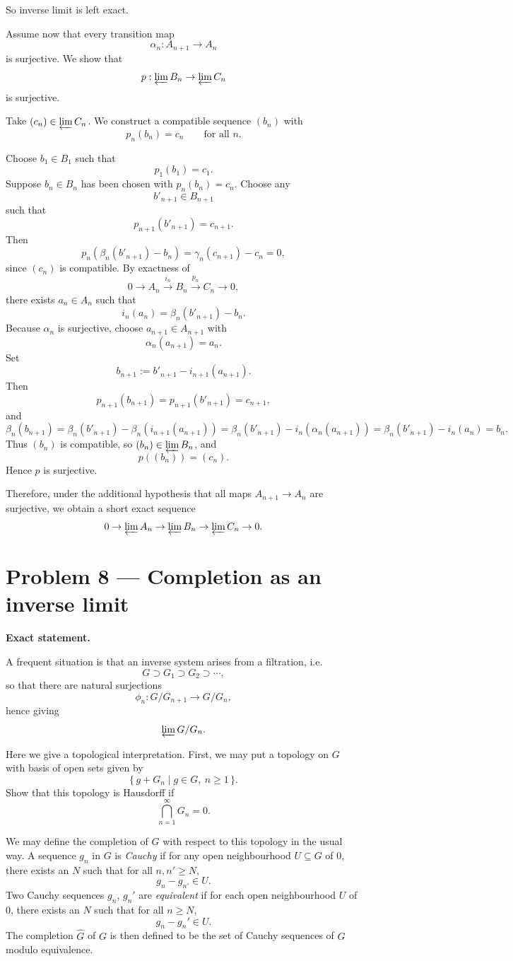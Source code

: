 \documentclass[12pt,a4paper]{article}
\theoremstyle{plain}
\theoremstyle{definition}      %
\begin{document}
So inverse limit is left exact.

\medskip
Assume now that every transition map
\[
\alpha_n:A_{n+1}\to A_n
\]
is surjective. We show that
\[
p:\varprojlim B_n\to \varprojlim C_n
\]
is surjective.

Take \((c_n)\in\varprojlim C_n\). We construct a compatible sequence \((b_n)\) with
\[
p_n(b_n)=c_n
\qquad \text{for all }n.
\]

Choose \(b_1\in B_1\) such that
\[
p_1(b_1)=c_1.
\]
Suppose \(b_n\in B_n\) has been chosen with \(p_n(b_n)=c_n\). Choose any
\[
b'_{n+1}\in B_{n+1}
\]
such that
\[
p_{n+1}(b'_{n+1})=c_{n+1}.
\]
Then
\[
p_n(\beta_n(b'_{n+1})-b_n)
=
\gamma_n(c_{n+1})-c_n
=
0,
\]
since \((c_n)\) is compatible. By exactness of
\[
0\to A_n\xrightarrow{i_n} B_n\xrightarrow{p_n} C_n\to 0,
\]
there exists \(a_n\in A_n\) such that
\[
i_n(a_n)=\beta_n(b'_{n+1})-b_n.
\]
Because \(\alpha_n\) is surjective, choose \(a_{n+1}\in A_{n+1}\) with
\[
\alpha_n(a_{n+1})=a_n.
\]
Set
\[
b_{n+1}:=b'_{n+1}-i_{n+1}(a_{n+1}).
\]
Then
\[
p_{n+1}(b_{n+1})=p_{n+1}(b'_{n+1})=c_{n+1},
\]
and
\[
\beta_n(b_{n+1})
=
\beta_n(b'_{n+1})-\beta_n(i_{n+1}(a_{n+1}))
=
\beta_n(b'_{n+1})-i_n(\alpha_n(a_{n+1}))
=
\beta_n(b'_{n+1})-i_n(a_n)
=
b_n.
\]
Thus \((b_n)\) is compatible, so \((b_n)\in\varprojlim B_n\), and
\[
p((b_n))=(c_n).
\]
Hence \(p\) is surjective.

Therefore, under the additional hypothesis that all maps \(A_{n+1}\to A_n\) are surjective, we obtain a short exact sequence
\[
0\to \varprojlim A_n \to \varprojlim B_n \to \varprojlim C_n \to 0.
\]
	
	
\section*{Problem 8 --- Completion as an inverse limit}

\textbf{Exact statement.}

A frequent situation is that an inverse system arises from a filtration, i.e.
\[
G \supset G_1 \supset G_2 \supset \cdots,
\]
so that there are natural surjections
\[
\phi_n:G/G_{n+1}\to G/G_n,
\]
hence giving
\[
\varprojlim G/G_n.
\]

Here we give a topological interpretation. First, we may put a topology on \(G\) with basis of open sets given by
\[
\{\,g+G_n \mid g\in G,\ n\ge 1\,\}.
\]
Show that this topology is Hausdorff if
\[
\bigcap_{n=1}^{\infty} G_n=0.
\]

We may define the completion of \(G\) with respect to this topology in the usual way. A sequence \(g_n\) in \(G\) is \emph{Cauchy} if for any open neighbourhood \(U\subseteq G\) of \(0\), there exists an \(N\) such that for all \(n,n'\ge N\),
\[
g_n-g_{n'}\in U.
\]
Two Cauchy sequences \(g_n\), \(g_n'\) are \emph{equivalent} if for each open neighbourhood \(U\) of \(0\), there exists an \(N\) such that for all \(n\ge N\),
\[
g_n-g_n'\in U.
\]
The completion \(\widehat G\) of \(G\) is then defined to be the set of Cauchy sequences of \(G\) modulo equivalence.
\end{document}
